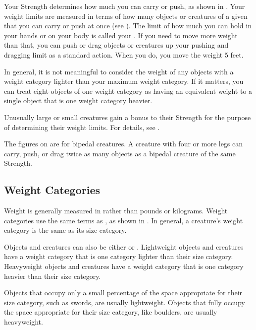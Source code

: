     Your Strength determines how much you can carry or push, as shown in .
    Your weight limits are measured in terms of how many objects or creatures of a given  that you can carry or push at once (see ).
    The limit of how much you can hold in your hands or on your body is called your .
    If you need to move more weight than that, you can push or drag objects or creatures up your pushing and dragging limit as a standard action.
    When you do, you move the weight 5 feet.

    In general, it is not meaningful to consider the weight of any objects with a weight category lighter than your maximum weight category.
    If it matters, you can treat eight objects of one weight category as having an equivalent weight to a single object that is one weight category heavier.

     Unusually large or small creatures gain a bonus to their Strength for the purpose of determining their weight limits.
    For details, see .

     The figures on  are for bipedal creatures.
    A creature with four or more legs can carry, push, or drag twice as many objects as a bipedal creature of the same Strength.

    \subsection{Weight Categories}\label{Weight Categories}
        Weight is generally measured in  rather than pounds or kilograms.
        Weight categories use the same terms as , as shown in .
        In general, a creature's weight category is the same as its size category.

        Objects and creatures can also be either  or .
        Lightweight objects and creatures have a weight category that is one category lighter than their size category.
        Heavyweight objects and creatures have a weight category that is one category heavier than their size category.

        Objects that occupy only a small percentage of the space appropriate for their size category, such as swords, are usually lightweight.
        Objects that fully occupy the space appropriate for their size category, like boulders, are usually heavyweight.

